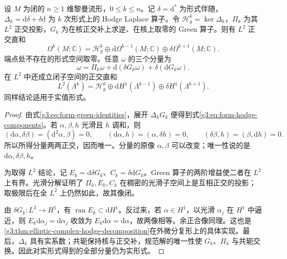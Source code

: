 \begin{theorem}\label{g3:thm:closed-hodge-decomposition}
	设 \(M\) 为闭的 \(n\ge1\) 维黎曼流形，\(0\le k\le n\)。记 \(\delta=\mathrm d^*\) 为形式伴随，\(\Delta_k=\mathrm d\delta+\delta\mathrm d\) 为 \(k\) 次形式上的 Hodge Laplace 算子。令 \(\mathcal H_g^k=\ker\Delta_k\)，\(\Pi_k\) 为其 \(L^2\) 正交投影，\(G_k\) 为在核正交补上求逆、在核上取零的 Green 算子。则有 \(L^2\) 正交直和
	\begin{equation}\label{g3:eq:closed-form-hodge-decomposition}
		\Omega^k(M;\mathbb C)
		=\mathcal H_g^k
		\oplus\mathrm d\Omega^{k-1}(M;\mathbb C)
		\oplus\delta\Omega^{k+1}(M;\mathbb C).
	\end{equation}
	端点处不存在的形式空间取零。任意 \(\omega\) 的三个分量为
	\begin{equation}\label{g3:eq:form-hodge-components}
		\omega=\Pi_k\omega
		+\mathrm d(\delta G_k\omega)
		+\delta(\mathrm dG_k\omega).
	\end{equation}
	在 \(L^2\) 中还成立闭子空间的正交直和
	\[
		L^2(\Lambda^k)
		=\mathcal H_g^k
		\oplus\mathrm dH^1(\Lambda^{k-1})
		\oplus\delta H^1(\Lambda^{k+1}).
	\]
	同样结论适用于实值形式。
\end{theorem}
\begin{proof}
	由式\eqref{g3:eq:form-green-identities}，展开 \(\Delta_kG_k\) 便得到式\eqref{g3:eq:form-hodge-components}。若 \(\alpha,\beta,h\) 光滑且 \(h\) 调和，则
	\[
		(\mathrm d\alpha,\delta\beta)
		=(\mathrm d^2\alpha,\beta)=0,\qquad
		(\mathrm d\alpha,h)=(\alpha,\delta h)=0,\qquad
		(\delta\beta,h)=(\beta,\mathrm dh)=0.
	\]
	所以所得分量两两正交，因而唯一。分量的原像 \(\alpha,\beta\) 可以改变；唯一性说的是 \(\mathrm d\alpha,\delta\beta,h\)。

	为取得 \(L^2\) 结论，记 \(E_k=\mathrm d\delta G_k\)、\(C_k=\delta\mathrm dG_k\)。Green 算子的两阶增益使二者在 \(L^2\) 上有界。光滑分解证明了 \(\Pi_k,E_k,C_k\) 在稠密的光滑子空间上是互相正交的投影；取极限后在全 \(L^2\) 上仍然如此，故其像闭。

	由 \(\delta G_k:L^2\to H^1\)，有 \(\operatorname{ran}E_k\subset\mathrm dH^1\)。反过来，若 \(\alpha\in H^1\)，以光滑 \(\alpha_j\) 在 \(H^1\) 中逼近，则
	\(E_k\mathrm d\alpha_j=\mathrm d\alpha_j\) 收敛为 \(E_k\mathrm d\alpha=\mathrm d\alpha\)，故两像相等。余正合像同理。这也是\cref{g3:thm:elliptic-complex-hodge-decomposition}在外微分复形上的具体实现。最后，\(\Delta_k\) 具有实系数；共轭保持核与正交补，规范解的唯一性使 \(G_k\)、\(\Pi_k\) 与共轭交换。因此对实形式得到的全部分量仍为实形式。
\end{proof}

